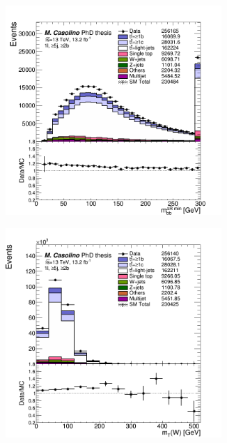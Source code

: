 \begin{figure}[p]
\begin{subfigure}{0.33\textwidth}
  \caption{}
  \label{}
\end{subfigure}
\begin{subfigure}{0.33\textwidth}
  \centering
  \includegraphics[width=0.9\textwidth]{figures/VLQ/presel/1lep/canv_c1l2b_mbb_mindR.png}
  \caption{}
  \label{}
\end{subfigure}
\begin{subfigure}{0.33\textwidth}
  \centering
  \includegraphics[width=0.9\textwidth]{figures/VLQ/presel/1lep/canv_c1l2b_mtw.png}

\end{subfigure}
\end{figure}
